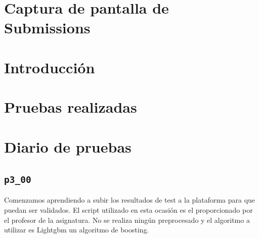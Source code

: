 \documentclass[a4paper, 20pt]{article}
\begin{document}
\section{Captura de pantalla de Submissions}
\label{sec:subsimissions}
\pagebreak

\section{Introducción}


\section{Pruebas realizadas}
\begin{table}[H]
\centering
\caption{Pruebas realizadas}
\label{tab:pruebas}
\end{table}
\newpage

\section{Diario de pruebas}
\subsection{\texttt{p3\_00}}
Comenzamos aprendiendo a subir los resultados de test a la plataforma para que puedan ser validados. El script utilizado en esta ocasión es el proporcionado por el profesor de la asignatura. No se realiza ningún preprocesado y el algoritmo a utilizar es Lightgbm un algoritmo de boosting.
\end{document}
